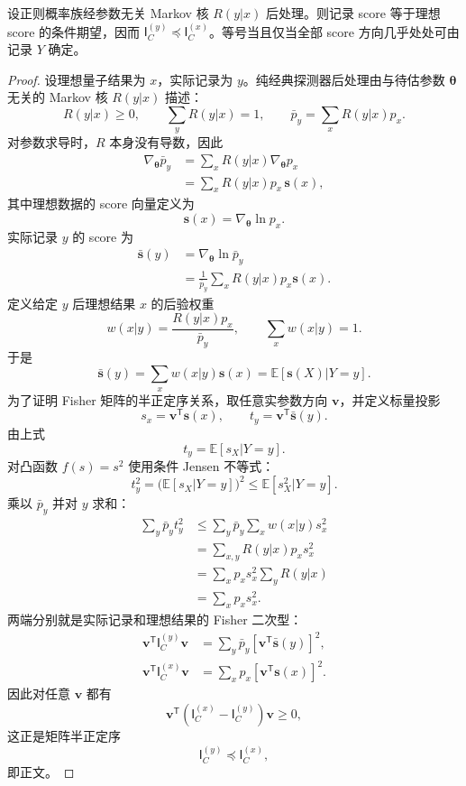 \begin{theorem}
设正则概率族经参数无关 Markov 核 $R(y|x)$ 后处理。则记录 score 等于理想 score 的条件期望，因而 $\mathsf I_C^{(y)}\preceq\mathsf I_C^{(x)}$。等号当且仅当全部 score 方向几乎处处可由记录 $Y$ 确定。
\end{theorem}
\begin{proof}
设理想量子结果为 $x$，实际记录为 $y$。纯经典探测器后处理由与待估参数 $\boldsymbol\theta$ 无关的 Markov 核 $R(y|x)$ 描述：
\[
R(y|x)\ge0,
\qquad
\sum_yR(y|x)=1,
\qquad
\bar p_y=\sum_xR(y|x)p_x.
\]
对参数求导时，$R$ 本身没有导数，因此
\begin{align*}
\nabla_{\boldsymbol\theta}\bar p_y
&=\sum_xR(y|x)\nabla_{\boldsymbol\theta}p_x\\
&=\sum_xR(y|x)p_x\,\mathbf s(x),
\end{align*}
其中理想数据的 score 向量定义为
\[
\mathbf s(x)=\nabla_{\boldsymbol\theta}\ln p_x.
\]
实际记录 $y$ 的 score 为
\begin{align*}
\bar{\mathbf s}(y)
&=\nabla_{\boldsymbol\theta}\ln\bar p_y\\
&=\frac1{\bar p_y}
\sum_xR(y|x)p_x\mathbf s(x).
\end{align*}
定义给定 $y$ 后理想结果 $x$ 的后验权重
\[
w(x|y)=\frac{R(y|x)p_x}{\bar p_y},
\qquad
\sum_xw(x|y)=1.
\]
于是
\[
\bar{\mathbf s}(y)=\sum_xw(x|y)\mathbf s(x)
=\mathbb E[\mathbf s(X)|Y=y].
\]
为了证明 Fisher 矩阵的半正定序关系，取任意实参数方向 $\mathbf v$，并定义标量投影
\[
s_x=\mathbf v^{\mathsf T}\mathbf s(x),
\qquad
t_y=\mathbf v^{\mathsf T}\bar{\mathbf s}(y).
\]
由上式
\[
t_y=\mathbb E[s_X|Y=y].
\]
对凸函数 $f(s)=s^2$ 使用条件 Jensen 不等式：
\[
t_y^2
=\bigl(\mathbb E[s_X|Y=y]\bigr)^2
\le\mathbb E[s_X^2|Y=y].
\]
乘以 $\bar p_y$ 并对 $y$ 求和：
\begin{align*}
\sum_y\bar p_yt_y^2
&\le\sum_y\bar p_y
\sum_xw(x|y)s_x^2\\
&=\sum_{x,y}R(y|x)p_xs_x^2\\
&=\sum_xp_xs_x^2\sum_yR(y|x)\\
&=\sum_xp_xs_x^2.
\end{align*}
两端分别就是实际记录和理想结果的 Fisher 二次型：
\begin{align*}
\mathbf v^{\mathsf T}\mathsf I_C^{(y)}\mathbf v
&=\sum_y\bar p_y
[\mathbf v^{\mathsf T}\bar{\mathbf s}(y)]^2,\\
\mathbf v^{\mathsf T}\mathsf I_C^{(x)}\mathbf v
&=\sum_xp_x
[\mathbf v^{\mathsf T}\mathbf s(x)]^2.
\end{align*}
因此对任意 $\mathbf v$ 都有
\[
\mathbf v^{\mathsf T}
(\mathsf I_C^{(x)}-\mathsf I_C^{(y)})\mathbf v\ge0,
\]
这正是矩阵半正定序
\[
\mathsf I_C^{(y)}\preceq\mathsf I_C^{(x)},
\]
即正文。
\end{proof}


